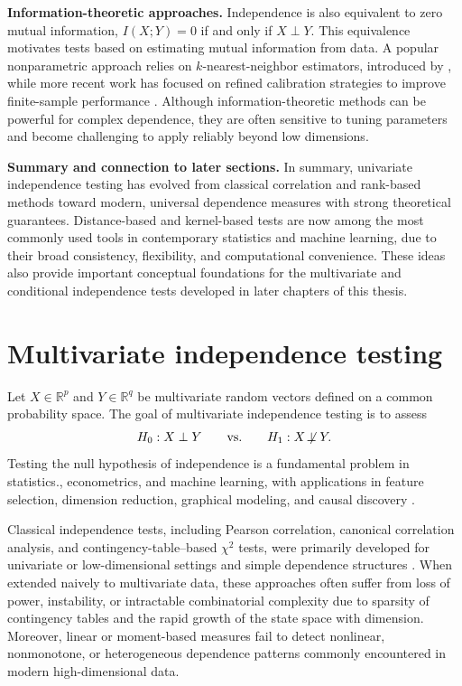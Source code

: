 \documentclass[12pt,reqno,oneside]{amsbook}
\theoremstyle{definition}
\theoremstyle{remark}
\begin{document}
\textbf{Information-theoretic approaches.}
Independence is also equivalent to zero mutual information,
$I(X;Y)=0$ if and only if $X\perp Y$.
This equivalence motivates tests based on estimating mutual information from data.
A popular nonparametric approach relies on $k$-nearest-neighbor estimators,
introduced by \citet{KraskovStoegbauerGrassberger2004},
while more recent work has focused on refined calibration strategies
to improve finite-sample performance \citep{BerrettSamworth2019}.
Although information-theoretic methods can be powerful for complex dependence,
they are often sensitive to tuning parameters and become challenging
to apply reliably beyond low dimensions.

\textbf{Summary and connection to later sections.}
In summary, univariate independence testing has evolved from classical correlation
and rank-based methods toward modern, universal dependence measures
with strong theoretical guarantees.
Distance-based and kernel-based tests are now among the most commonly used tools
in contemporary statistics and machine learning,
due to their broad consistency, flexibility, and computational convenience.
These ideas also provide important conceptual foundations
for the multivariate and conditional independence tests
developed in later chapters of this thesis.


\section{Multivariate independence testing}
\label{subsec:mi_intro}

Let $X\in\mathbb{R}^{p}$ and $Y\in\mathbb{R}^{q}$ be multivariate random vectors
defined on a common probability space. The goal of multivariate independence
testing is to assess
\[
H_0: X \perp Y
\qquad \text{vs.}\qquad
H_1: X \not\!\perp Y.
\]
Testing the null hypothesis of independence is a fundamental problem in statistics.,
econometrics, and machine learning, with applications in feature selection,
dimension reduction, graphical modeling, and causal discovery
\citep{Dai2022IndependenceTA,zhu2025independence_icml}.

Classical independence tests, including Pearson correlation, canonical
correlation analysis, and contingency-table--based $\chi^2$ tests, were primarily
developed for univariate or low-dimensional settings and simple dependence
structures \citep{Agresti2013}. When extended naively to multivariate data, these
approaches often suffer from loss of power, instability, or intractable
combinatorial complexity due to sparsity of contingency tables and the rapid
growth of the state space with dimension. Moreover, linear or moment-based
measures fail to detect nonlinear, nonmonotone, or heterogeneous dependence
patterns commonly encountered in modern high-dimensional data.
\end{document}
